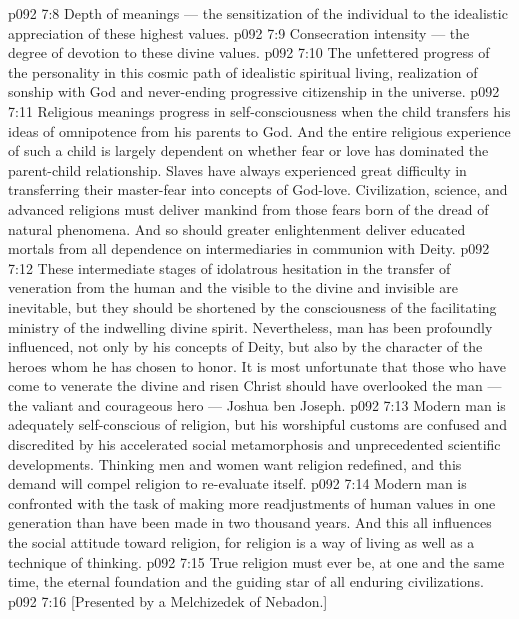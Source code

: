 \vs p092 7:8 \bibnobreakspace Depth of meanings --- the sensitization of the individual to the idealistic appreciation of these highest values.
\vs p092 7:9 \bibnobreakspace Consecration intensity --- the degree of devotion to these divine values.
\vs p092 7:10 \bibnobreakspace The unfettered progress of the personality in this cosmic path of idealistic spiritual living, realization of sonship with God and never\hyp{}ending progressive citizenship in the universe.
\vs p092 7:11 \pc Religious meanings progress in self\hyp{}consciousness when the child transfers his ideas of omnipotence from his parents to God. And the entire religious experience of such a child is largely dependent on whether fear or love has dominated the parent\hyp{}child relationship. Slaves have always experienced great difficulty in transferring their master\hyp{}fear into concepts of God\hyp{}love. Civilization, science, and advanced religions must deliver mankind from those fears born of the dread of natural phenomena. And so should greater enlightenment deliver educated mortals from all dependence on intermediaries in communion with Deity.
\vs p092 7:12 These intermediate stages of idolatrous hesitation in the transfer of veneration from the human and the visible to the divine and invisible are inevitable, but they should be shortened by the consciousness of the facilitating ministry of the indwelling divine spirit. Nevertheless, man has been profoundly influenced, not only by his concepts of Deity, but also by the character of the heroes whom he has chosen to honor. It is most unfortunate that those who have come to venerate the divine and risen Christ should have overlooked the man --- the valiant and courageous hero --- Joshua ben Joseph.
\vs p092 7:13 \pc Modern man is adequately self\hyp{}conscious of religion, but his worshipful customs are confused and discredited by his accelerated social metamorphosis and unprecedented scientific developments. Thinking men and women want religion redefined, and this demand will compel religion to re\hyp{}evaluate itself.
\vs p092 7:14 Modern man is confronted with the task of making more readjustments of human values in one generation than have been made in two thousand years. And this all influences the social attitude toward religion, for religion is a way of living as well as a technique of thinking.
\vs p092 7:15 \pc True religion must ever be, at one and the same time, the eternal foundation and the guiding star of all enduring civilizations.
\vsetoff
\vs p092 7:16 [Presented by a Melchizedek of Nebadon.]
